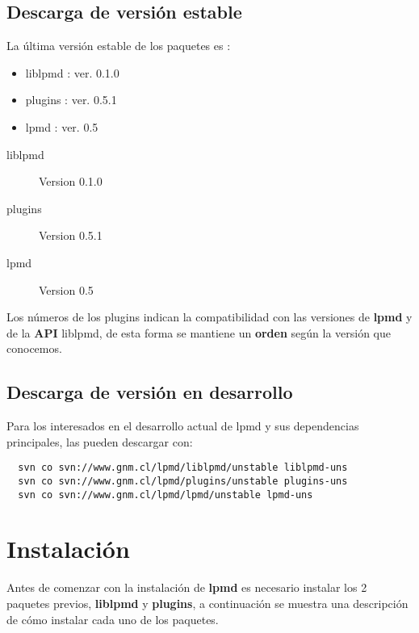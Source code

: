 \documentclass[a4paper,10pt]{scrbook}
\newcommand{\lpmd}{\textbf{lpmd }}
\begin{document}
\subsection{Descarga de versi\'on estable}

La \'ultima versi\'on estable de los paquetes es :

\begin{itemize}
 \item liblpmd : ver. 0.1.0
 \item plugins : ver. 0.5.1
 \item lpmd    : ver. 0.5
\end{itemize}

\begin{description}
 \item [liblpmd] Version 0.1.0
 \item [plugins] Version 0.5.1
 \item [lpmd] Version 0.5
\end{description}


Los n\'umeros de los plugins indican la compatibilidad con las versiones de \lpmd y de la \textbf{API} liblpmd, de esta forma se mantiene un \textbf{orden} seg\'un la versi\'on que conocemos.

\subsection{Descarga de versi\'on en desarrollo}

Para los interesados en el desarrollo actual de lpmd y sus dependencias principales, las pueden descargar con:

\begin{center}
 \begin{verbatim}
  svn co svn://www.gnm.cl/lpmd/liblpmd/unstable liblpmd-uns
  svn co svn://www.gnm.cl/lpmd/plugins/unstable plugins-uns
  svn co svn://www.gnm.cl/lpmd/lpmd/unstable lpmd-uns
 \end{verbatim}
\end{center}

\section{Instalaci\'on}
Antes de comenzar con la instalaci\'on de \lpmd es necesario instalar los 2 paquetes previos, \textbf{liblpmd} y \textbf{plugins}, a continuaci\'on se muestra una descripci\'on de c\'omo instalar cada uno de los paquetes.
\end{document}
